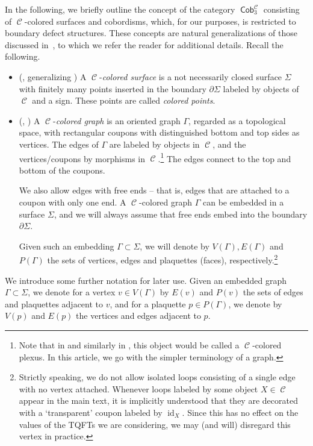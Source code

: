 \documentclass[pdftex]{sigma}
\DeclareMathOperator{\id}{id}
\DeclareMathOperator{\Cob}{\mathsf{Cob}}
\DeclareMathOperator{\calc}{\mathcal{C}}
\numberwithin{equation}{section}
\theoremstyle{definition}
\begin{document}
In the following, we briefly outline the concept of the category $\Cob_3^{\calc}$ consisting of $\calc$-colored surfaces and cobordisms, which, for our purposes, is restricted to boundary defect structures. These concepts are natural generalizations of those discussed in~\cite{TV}, to which we refer the reader for additional details. Recall the following.
\begin{itemize}\itemsep=0pt
 \item (\cite[Definition 4.2.5]{F}, generalizing \cite[Section 15.1.1]{TV}) A $\calc$-\textit{colored surface} is a not necessarily closed surface $\Sigma$ with finitely many points inserted in the boundary $\partial \Sigma$ labeled by objects of $\calc$ and a sign. These points are called \textit{colored points}.
 \item (\cite[Definition 4.2.7]{F}, \cite[Section 15.1.2]{TV}) A $\calc$-\textit{colored graph} is an oriented graph $\Gamma$, regarded as a topological space, with rectangular coupons with distinguished bottom and top sides as vertices. The edges of $\Gamma$ are labeled by objects in $\calc$, and the vertices/coupons by morphisms in $\calc$.\footnote{Note that in \cite{F} and similarly in \cite{TV}, this object would be called a $\calc$-colored plexus. In this article, we go with the simpler terminology of a graph.\label{footNoLoops}} The edges connect to the top and bottom of the coupons.

 We also allow edges with free ends -- that is, edges that are attached to a coupon with only one end. A $\calc$-colored graph $\Gamma$ can be embedded in a surface $\Sigma$, and we will always assume that free ends embed into the boundary $\partial \Sigma$.

 Given such an embedding $\Gamma \subset \Sigma$, we will denote by $V(\Gamma), E(\Gamma)$ and $P(\Gamma)$ the sets of vertices, edges and plaquettes (faces), respectively.\footnote{Strictly speaking, we do not allow isolated loops consisting of a single edge with no vertex attached. Whenever loops labeled by some object $X \in \calc$ appear in the main text, it is implicitly understood that they are decorated with a `transparent' coupon labeled by $\id_X$. Since this has no effect on the values of the TQFTs we are considering, we may (and will) disregard this vertex in practice.}
\end{itemize}
We introduce some further notation for later use. Given an embedded graph $\Gamma \subset \Sigma$, we denote for a vertex $v \in V(\Gamma)$ by $E(v)$ and $P(v)$ the sets of edges and plaquettes adjacent to $v$, and for a plaquette $p \in P(\Gamma)$, we denote by $V(p)$ and $E(p)$ the vertices and edges adjacent to $p$.
\end{document}
